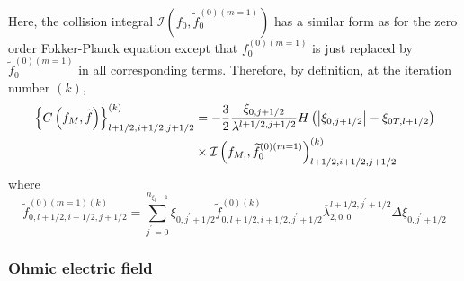Here, the collision integral $\mathcal{I}\left( f_{0},\widetilde{f}%
_{0}^{\left( 0\right) \left( m=1\right) }\right) $ has a similar form as for
the zero order Fokker-Planck equation except that $f_{0}^{\left( 0\right)
\left( m=1\right) }$ is just replaced by $\widetilde{f}_{0}^{\left( 0\right)
\left( m=1\right) }$ in all corresponding terms. Therefore, by definition,
at the iteration number $\left( k\right) ,$%
\begin{align}
\left\{ C\left( f_{M},\widetilde{f}\right) \right\}
_{l+1/2,i+1/2,j+1/2}^{\left( k\right) }&=-\frac{3}{2}\frac{\xi _{0,j+1/2}}{%
\lambda ^{l+1/2,j+1/2}}H\left( \left| \xi _{0,j+1/2}\right| -\xi
_{0T,l+1/2}\right)\nonumber\\&\times \mathcal{I}\left(
f_{M,},\widetilde{f}_{0}^{\left( 0\right) \left( m=1\right)
}\right) _{l+1/2,i+1/2,j+1/2}^{\left( k\right) }
\end{align}
where
\begin{equation}
\widetilde{f}_{0,l+1/2,i+1/2,j+1/2}^{\left( 0\right) \left( m=1\right)
\left( k\right) }=\sum_{j^{\prime }=0}^{n_{\xi _{0}-1}}\xi _{0,j^{\prime
}+1/2}\widetilde{f}_{0,l+1/2,i+1/2,j^{\prime }+1/2}^{\left( 0\right) \left(
k\right) }\overline{\lambda }_{2,0,0}^{l+1/2,j^{\prime }+1/2}\Delta \xi
_{0,j^{\prime }+1/2}
\end{equation}

\subsubsection{Ohmic electric field}

